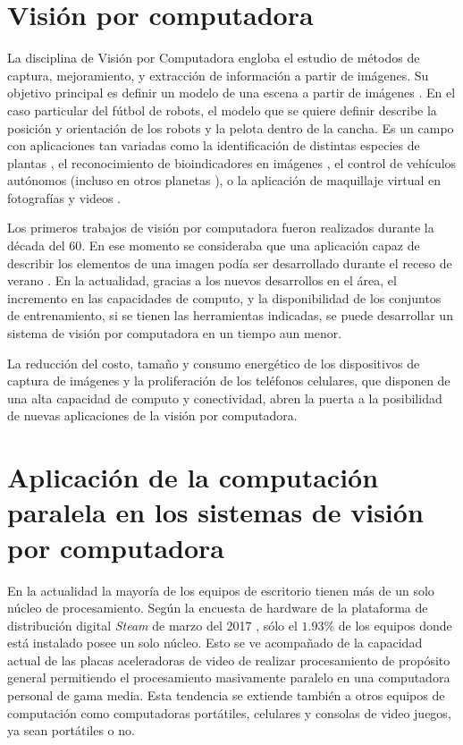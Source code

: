 
\section{Visión por computadora}

La disciplina de Visión por Computadora engloba el estudio de métodos de
captura, mejoramiento, y extracción de información a partir de imágenes. Su
objetivo principal es definir un modelo de una escena a partir de imágenes
\cite{cvLinda2001}. En el caso particular del fútbol de robots, el modelo que se
quiere definir describe la posición y orientación de los robots y la pelota
dentro de la cancha. Es un campo con aplicaciones tan variadas como la
identificación de distintas especies de plantas
\cite{plantIdentificacionUCVT2018}, el reconocimiento de bioindicadores en
imágenes \cite{anurosEmImagm2016}, el control de vehículos autónomos
\cite{e2eLearning4SDC} (incluso en otros planetas
\cite{twoYearsMarsRovers2007}), o la aplicación de maquillaje virtual en
fotografías y videos \cite{virtualMakeup2015}.

Los primeros trabajos de visión por computadora fueron realizados durante la
década del 60. En ese momento se consideraba que una aplicación capaz de
describir los elementos de una imagen podía ser desarrollado durante el receso
de verano \cite{summerVisionProject1966}. En la actualidad, gracias a los nuevos
desarrollos en el área, el incremento en las capacidades de computo, y la
disponibilidad de los conjuntos de entrenamiento, si se tienen las herramientas
indicadas, se puede desarrollar un sistema de visión por computadora en un
tiempo aun menor.

La reducción del costo, tamaño y consumo energético de los dispositivos de
captura de imágenes y la proliferación de los teléfonos celulares, que disponen
de una alta capacidad de computo y conectividad, abren la puerta a la
posibilidad de nuevas aplicaciones de la visión por computadora.

\section{Aplicación de la computación paralela en los sistemas de visión por
computadora}

\label{algoritmosParalelosYVision}

En la actualidad la mayoría de los equipos de escritorio tienen más de un solo
núcleo de procesamiento. Según la encuesta de hardware de la plataforma de
distribución digital \emph{Steam} de marzo del 2017 \cite{steamSurvey}, sólo
el $1.93$\% de los equipos donde está instalado posee un solo núcleo. Esto se
ve acompañado de la capacidad actual de las placas aceleradoras de video de
realizar procesamiento de propósito general permitiendo el procesamiento
masivamente paralelo en una computadora personal de gama media. Esta tendencia
se extiende también a otros equipos de computación como computadoras
portátiles, celulares y consolas de video juegos, ya sean portátiles o no.

